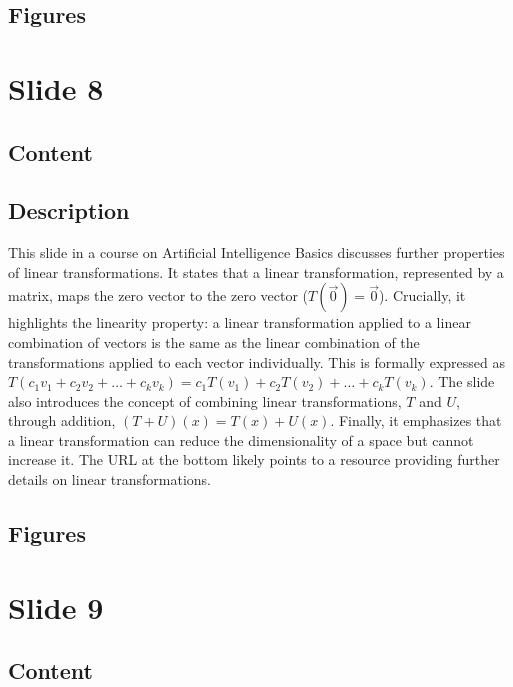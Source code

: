 \documentclass{article}%
\begin{document}
\subsection{Figures}%
\begin{figure}[H]%
\centering%
\end{figure}

%
\newpage%
\section{Slide 8}%
\label{sec:Slide8}%
\subsection{Content}%
%
\subsection{Description}%
This slide in a course on Artificial Intelligence Basics discusses further properties of linear transformations. It states that a linear transformation, represented by a matrix, maps the zero vector to the zero vector ($T(\vec{0}) = \vec{0}$).  Crucially, it highlights the linearity property:  a linear transformation applied to a linear combination of vectors is the same as the linear combination of the transformations applied to each vector individually.  This is formally expressed as $T(c_1v_1 + c_2v_2 + \dots + c_kv_k) = c_1T(v_1) + c_2T(v_2) + \dots + c_kT(v_k)$.  The slide also introduces the concept of combining linear transformations, $T$ and $U$, through addition, $(T+U)(x) = T(x) + U(x)$.  Finally, it emphasizes that a linear transformation can reduce the dimensionality of a space but cannot increase it. The URL at the bottom likely points to a resource providing further details on linear transformations.%
\subsection{Figures}%
\begin{figure}[H]%
\centering%
\end{figure}

%
\newpage%
\section{Slide 9}%
\label{sec:Slide9}%
\subsection{Content}%
\end{document}
